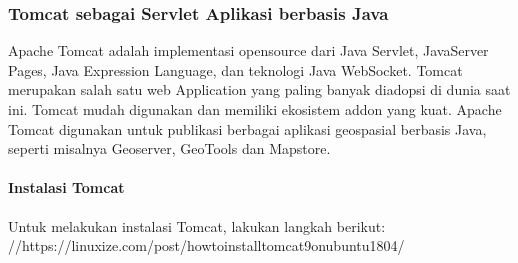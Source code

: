 \documentclass[letterpaper,10pt,english]{sphinxmanual}
\begin{document}
\subsubsection{Tomcat sebagai Servlet Aplikasi berbasis Java}
\label{\detokenize{sesi1/linuxserver:tomcat-sebagai-servlet-aplikasi-berbasis-java}}
Apache Tomcat adalah implementasi open\sphinxhyphen{}source dari Java Servlet, JavaServer Pages, Java Expression Language, dan teknologi Java WebSocket. Tomcat merupakan salah satu web Application yang paling banyak diadopsi di dunia saat ini. Tomcat mudah digunakan dan memiliki ekosistem add\sphinxhyphen{}on yang kuat. Apache Tomcat digunakan untuk publikasi berbagai aplikasi geospasial berbasis Java, seperti misalnya Geoserver, GeoTools dan Mapstore.


\paragraph{Instalasi Tomcat}
\label{\detokenize{sesi1/linuxserver:instalasi-tomcat}}
Untuk melakukan instalasi Tomcat, lakukan langkah berikut:
//https://linuxize.com/post/how\sphinxhyphen{}to\sphinxhyphen{}install\sphinxhyphen{}tomcat\sphinxhyphen{}9\sphinxhyphen{}on\sphinxhyphen{}ubuntu\sphinxhyphen{}18\sphinxhyphen{}04/
\end{document}
